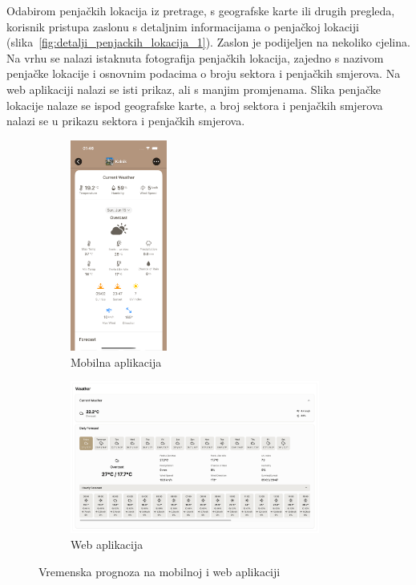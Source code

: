 Odabirom penjačkih lokacija iz pretrage, s geografske karte ili drugih pregleda, korisnik pristupa zaslonu s detaljnim informacijama o penjačkoj lokaciji (slika~\ref{fig:detalji_penjackih_lokacija_1}). Zaslon je podijeljen na nekoliko cjelina. Na vrhu se nalazi istaknuta fotografija penjačkih lokacija, zajedno s nazivom penjačke lokacije i osnovnim podacima o broju sektora i penjačkih smjerova. 
Na web aplikaciji nalazi se isti prikaz, ali s manjim promjenama. Slika penjačke lokacije nalaze se ispod geografske karte, a broj sektora i penjačkih smjerova nalazi se u prikazu sektora i penjačkih smjerova.

\begin{figure}[H]
    \centering
    \begin{subfigure}[b]{\textwidth}
        \centering
        \includegraphics[width=0.35\textwidth]{images/implementacija/crag-details/crag-weather-1.png}
        \caption{Mobilna aplikacija}
        \label{fig:vremenska_prognoza_mob}
    \end{subfigure}
    \hfill
    \begin{subfigure}[b]{\textwidth}
        \centering
        \includegraphics[width=0.9\textwidth]{images/implementacija/web/crag-details/crag-weather.png}
        \caption{Web aplikacija}
        \label{fig:vremenska_prognoza_web}
    \end{subfigure}
    \caption{Vremenska prognoza na mobilnoj i web aplikaciji}
    \label{fig:vremenska_prognoza}
\end{figure}

